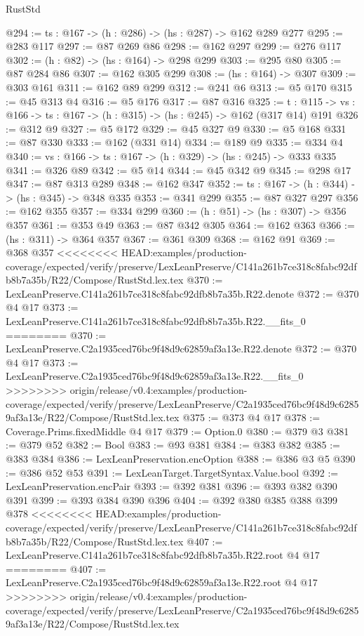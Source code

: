 \begin{lexlean}{RustStd}
\begin{coremodule}
{\begin{coremodule}
@294 := {ts : @167} -> (h : @286) -> (hs : @287) -> @162 @289 @277
@295 := @283 @117
@297 := @87 @269 @86
@298 := @162 @297
@299 := @276 @117
@302 := (h : @82) -> (hs : @164) -> @298 @299
@303 := @295 @80
@305 := @87 @284 @86
@307 := @162 @305 @299
@308 := (hs : @164) -> @307
@309 := @303 @161
@311 := @162 @89 @299
@312 := @241 @6
@313 := @5 @170
@315 := @45 @313 @4
@316 := @5 @176
@317 := @87 @316
@325 := {t : @115} ->
  {vs : @166} -> {ts : @167} -> (h : @315) -> (hs : @245) -> @162 (@317 @14) @191
@326 := @312 @9
@327 := @5 @172
@329 := @45 @327 @9
@330 := @5 @168
@331 := @87 @330
@333 := @162 (@331 @14)
@334 := @189 @9
@335 := @334 @4
@340 := {vs : @166} -> {ts : @167} -> (h : @329) -> (hs : @245) -> @333 @335
@341 := @326 @89
@342 := @5 @14
@344 := @45 @342 @9
@345 := @298 @17
@347 := @87 @313 @289
@348 := @162 @347
@352 := {ts : @167} -> (h : @344) -> (hs : @345) -> @348 @335
@353 := @341 @299
@355 := @87 @327 @297
@356 := @162 @355
@357 := @334 @299
@360 := (h : @51) -> (hs : @307) -> @356 @357
@361 := @353 @49
@363 := @87 @342 @305
@364 := @162 @363
@366 := (hs : @311) -> @364 @357
@367 := @361 @309
@368 := @162 @91
@369 := @368 @357
<<<<<<<< HEAD:examples/production-coverage/expected/verify/preserve/LexLeanPreserve/C141a261b7ce318c8fabc92dfb8b7a35b/R22/Compose/RustStd.lex.tex
@370 := LexLeanPreserve.C141a261b7ce318c8fabc92dfb8b7a35b.R22.denote
@372 := @370 @4 @17
@373 := LexLeanPreserve.C141a261b7ce318c8fabc92dfb8b7a35b.R22.__fits_0
========
@370 := LexLeanPreserve.C2a1935ced76bc9f48d9c62859af3a13e.R22.denote
@372 := @370 @4 @17
@373 := LexLeanPreserve.C2a1935ced76bc9f48d9c62859af3a13e.R22.__fits_0
>>>>>>>> origin/release/v0.4:examples/production-coverage/expected/verify/preserve/LexLeanPreserve/C2a1935ced76bc9f48d9c62859af3a13e/R22/Compose/RustStd.lex.tex
@375 := @373 @4 @17
@378 := Coverage.Prims.fixedMiddle @4 @17
@379 := Option.{0}
@380 := @379 @3
@381 := @379 @52
@382 := Bool
@383 := @93 @381
@384 := @383 @382
@385 := @383 @384
@386 := LexLeanPreservation.encOption
@388 := @386 @3 @5
@390 := @386 @52 @53
@391 := LexLeanTarget.TargetSyntax.Value.bool
@392 := LexLeanPreservation.encPair
@393 := @392 @381
@396 := @393 @382 @390 @391
@399 := @393 @384 @390 @396
@404 := @392 @380 @385 @388 @399 @378
<<<<<<<< HEAD:examples/production-coverage/expected/verify/preserve/LexLeanPreserve/C141a261b7ce318c8fabc92dfb8b7a35b/R22/Compose/RustStd.lex.tex
@407 := LexLeanPreserve.C141a261b7ce318c8fabc92dfb8b7a35b.R22.root @4 @17
========
@407 := LexLeanPreserve.C2a1935ced76bc9f48d9c62859af3a13e.R22.root @4 @17
>>>>>>>> origin/release/v0.4:examples/production-coverage/expected/verify/preserve/LexLeanPreserve/C2a1935ced76bc9f48d9c62859af3a13e/R22/Compose/RustStd.lex.tex

\end{coremodule}}
\end{coremodule}
\end{lexlean}
